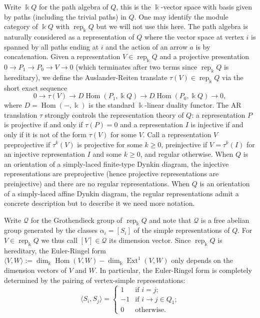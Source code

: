 \documentclass[12pt]{amsart}
\newcommand{\sayDR}[1]{\say[DR]{\color{red}{\bf DR:}\;#1}}
\newcommand{\kk}{\Bbbk}%
\newcommand{\cQ}{\mathcal{Q}}
\newcommand{\rep}{\operatorname{rep}}
\DeclareMathOperator{\Ext}{Ext}
\DeclareMathOperator{\Hom}{Hom}
\theoremstyle{remark}
\numberwithin{equation}{section}
\begin{document}
  Write $\kk Q$ for the path algebra of $Q$, this is the $\kk$-vector space with basis given by paths (including the trivial paths) in $Q$.  
  One may identify the module category of $\kk Q$ with $\rep_\kk Q$ but we will not use this here.  
  The path algebra is naturally considered as a representation of $Q$ where the vector space at vertex $i$ is spanned by all paths ending at $i$ and the action of an arrow $a$ is by concatenation.  
  Given a representation $V\in\rep_\kk Q$ and a projective presentation $0\to P_1\to P_0\to V\to 0$ (which terminates after two terms since $\rep_\kk Q$ is hereditary), we define the Auslander-Reiten translate $\tau(V)\in\rep_\kk Q$ via the short exact sequence
  \begin{equation}\label{eq:AR translation}
    0\longrightarrow \tau(V)\longrightarrow D\Hom(P_1,\kk Q)\longrightarrow D\Hom(P_0,\kk Q)\longrightarrow 0,
  \end{equation}
  where $D=\Hom(-,\kk)$ is the standard $\kk$-linear duality functor.  
  The AR translation $\tau$ strongly controls the representation theory of $Q$: a representation $P$ is projective if and only if $\tau(P)=0$ and a representation $I$ is injective if and only if it is not of the form $\tau(V)$ for some $V$.  
  Call a representation $V$ preprojective if $\tau^k(V)$ is projective for some $k\ge0$, preinjective\sayDR{post?} if $V=\tau^k(I)$ for an injective representation $I$ and some $k\ge0$, and regular otherwise.  
  When $Q$ is an orientation of a simply-laced finite-type Dynkin diagram, the injective representations are preprojective (hence projective representations are preinjective) and there are no regular representations.  
  When $Q$ is an orientation of a simply-laced affine Dynkin diagram, the regular representations admit a concrete description but to describe it we need more notation.

  Write $\cQ$ for the Grothendieck group of $\rep_\kk Q$ and note that $\cQ$ is a free abelian group generated by the classes $\alpha_i=[S_i]$ of the simple representations of $Q$.  
  For $V\in\rep_\kk Q$ we thus call $[V]\in\cQ$ its dimension vector.  
  Since $\rep_\kk Q$ is hereditary, the Euler-Ringel form $\langle V,W\rangle:=\dim_\kk\Hom(V,W)-\dim_\kk\Ext^1(V,W)$ only depends on the dimension vectors of $V$ and $W$.  
  In particular, the Euler-Ringel form is completely determined by the pairing of vertex-simple representations:
  \[\langle S_i,S_j\rangle=\begin{cases}1 & \text{if $i=j$;}\\ -1 & \text{if $i\to j\in Q_1$;}\\ 0 & \text{otherwise.}\end{cases}\]
\end{document}
